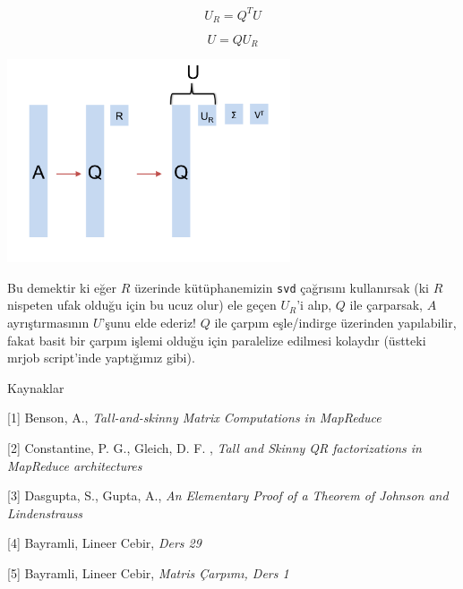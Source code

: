 \documentclass[12pt,fleqn]{article}\usepackage{../../common}
\begin{document}
$$ U_R = Q^T U $$ 

$$ U = QU_R $$ 

\includegraphics[height=6cm]{ur.png}

Bu demektir ki eğer $R$ üzerinde kütüphanemizin \verb!svd!  çağrısını
kullanırsak (ki $R$ nispeten ufak olduğu için bu ucuz olur) ele geçen $U_R$'i
alıp, $Q$ ile çarparsak, $A$ ayrıştırmasının $U$'şunu elde ederiz! $Q$ ile
çarpım eşle/indirge üzerinden yapılabilir, fakat basit bir çarpım işlemi olduğu
için paralelize edilmesi kolaydır (üstteki mrjob script'inde yaptığımız gibi).

Kaynaklar

[1] Benson, A., {\em Tall-and-skinny Matrix Computations in MapReduce}

[2] Constantine, P. G., Gleich, D. F. , {\em Tall and Skinny QR factorizations in MapReduce architectures}

[3] Dasgupta, S., Gupta, A., {\em An Elementary Proof of a Theorem of Johnson and Lindenstrauss}

[4] Bayramli, Lineer Cebir, {\em Ders 29}

[5] Bayramli, Lineer Cebir, {\em Matris Çarpımı, Ders 1}
\end{document}
